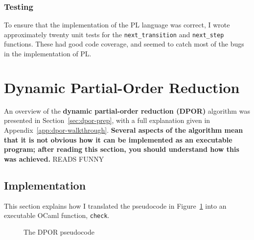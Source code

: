 \documentclass[12pt,a4paper,twoside,openright]{report}
\begin{document}
\subsubsection{Testing}
To ensure that the implementation of the PL
language was correct, I wrote approximately
twenty unit tests for
the \texttt{next\_transition} and
\texttt{next\_step} functions. These had good
code coverage, and seemed to catch most of the bugs
in the implementation of PL.


\section{Dynamic Partial-Order Reduction}
An overview of the \textbf{dynamic partial-order reduction (DPOR)}
algorithm was presented in Section~\ref{sec:dpor-prep},
with a full explanation
given in Appendix~\ref{app:dpor-walkthrough}.
\textbf{Several aspects of the algorithm mean that it
is not obvious how it can be implemented
as an executable program; after reading
this section, you should understand
how this was achieved.} READS FUNNY

\subsection{Implementation}
This section explains how I translated
the pseudocode in Figure~\ref{fig:dpor-imp-pscode}
into an executable OCaml function, \texttt{check}.

\begin{figure}
	\dporpseudocode
	\caption{The DPOR pseudocode}
	\label{fig:dpor-imp-pscode}
\end{figure}
\end{document}
